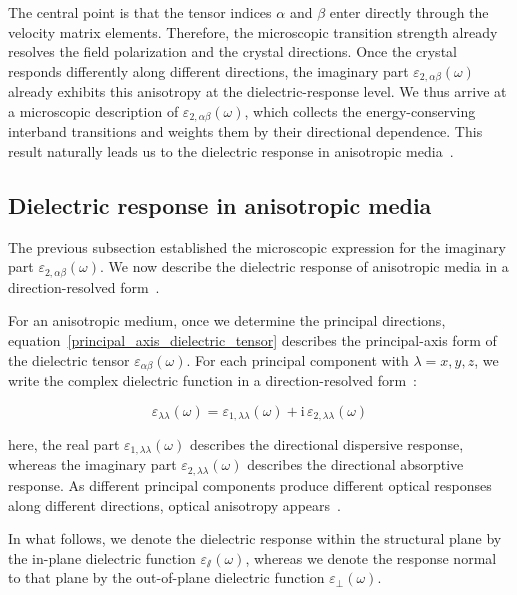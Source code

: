 The central point is that the tensor indices $\alpha$ and $\beta$ enter directly through the velocity matrix elements.
Therefore, the microscopic transition strength already resolves the field polarization and the crystal directions.
Once the crystal responds differently along different directions,
the imaginary part $\varepsilon_{2,\alpha\beta}(\omega)$ already exhibits this anisotropy at the dielectric-response level.
We thus arrive at a microscopic description of $\varepsilon_{2,\alpha\beta}(\omega)$,
which collects the energy-conserving interband transitions and weights them by their directional dependence.
This result naturally leads us to the dielectric response in anisotropic media~\cite{huang2023optical}.

\subsection{Dielectric response in anisotropic media}

The previous subsection established the microscopic expression for the imaginary part $\varepsilon_{2,\alpha\beta}(\omega)$.
We now describe the dielectric response of anisotropic media in a direction-resolved form~\cite{slavich2024exploring}.

For an anisotropic medium, once we determine the principal directions,
equation~\eqref{principal_axis_dielectric_tensor} describes the principal-axis form of the dielectric tensor $\varepsilon_{\alpha\beta}(\omega)$.
For each principal component with $\lambda=x,y,z$, 
we write the complex dielectric function in a direction-resolved form~\cite{nye1985physical}:

\begin{equation}
    \varepsilon_{\lambda\lambda}(\omega) =
    \varepsilon_{1,\lambda\lambda}(\omega)
    + \mathrm{i}\,\varepsilon_{2,\lambda\lambda}(\omega)
\label{direction_resolved_complex_dielectric_function}
\end{equation}

here, the real part $\varepsilon_{1,\lambda\lambda}(\omega)$ describes the directional dispersive response,
whereas the imaginary part $\varepsilon_{2,\lambda\lambda}(\omega)$ describes the directional absorptive response.
As different principal components produce different optical responses along different directions, 
optical anisotropy appears~\cite{nye1985physical}.

In what follows,
we denote the dielectric response within the structural plane by the in-plane dielectric function $\varepsilon_{\varparallel}(\omega)$,
whereas we denote the response normal to that plane by
the out-of-plane dielectric function $\varepsilon_{\perp}(\omega)$.

